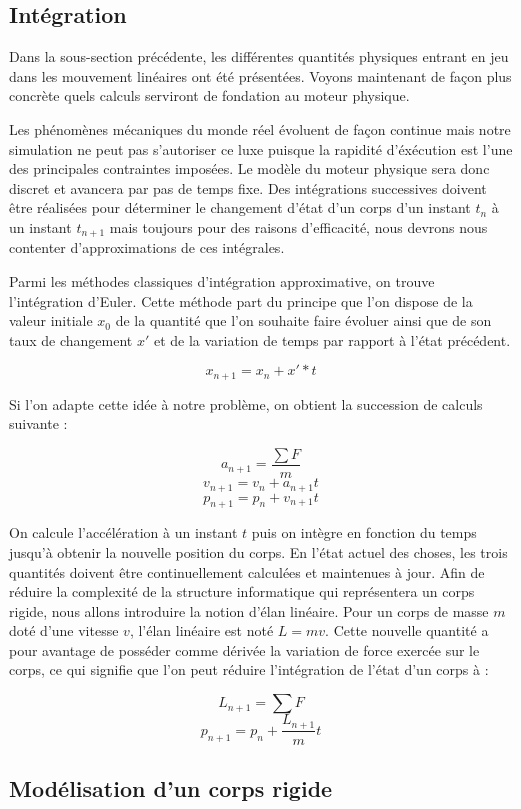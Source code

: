 \subsection{Intégration}

Dans la sous-section précédente, les différentes quantités physiques entrant en jeu dans les mouvement linéaires ont été présentées. Voyons maintenant de façon plus concrète quels calculs serviront de fondation au moteur physique.

Les phénomènes mécaniques du monde réel évoluent de façon continue mais notre simulation ne peut pas s'autoriser ce luxe puisque la rapidité d'éxécution est l'une des principales contraintes imposées. Le modèle du moteur physique sera donc discret et avancera par pas de temps fixe. Des intégrations successives doivent être réalisées pour déterminer le changement d'état d'un corps d'un instant $t_n$ à un instant $t_{n+1}$ mais toujours pour des raisons d'efficacité, nous devrons nous contenter d'approximations de ces intégrales.

Parmi les méthodes classiques d'intégration approximative, on trouve l'intégration d'Euler. Cette méthode part du principe que l'on dispose de la valeur initiale $x_0$ de la quantité que l'on souhaite faire évoluer ainsi que de son taux de changement $x'$ et de la variation de temps par rapport à l'état précédent.

\[x_{n+1} = x_{n} + x' * t\]

Si l'on adapte cette idée à notre problème, on obtient la succession de calculs suivante :

\[a_{n+1} = \frac{\sum F}{m}\]
\[v_{n+1} = v_n + a_{n+1} t\]
\[p_{n+1} = p_n + v_{n+1} t\]

On calcule l'accélération à un instant $t$ puis on intègre en fonction du temps jusqu'à obtenir la nouvelle position du corps. En l'état actuel des choses, les trois quantités doivent être continuellement calculées et maintenues à jour. Afin de réduire la complexité de la structure informatique qui représentera un corps rigide, nous allons introduire la notion d'élan linéaire. Pour un corps de masse $m$ doté d'une vitesse $v$, l'élan linéaire est noté $L = mv$. Cette nouvelle quantité a pour avantage de posséder comme dérivée la variation de force exercée sur le corps, ce qui signifie que l'on peut réduire l'intégration de l'état d'un corps à :

\[L_{n+1} = {\sum F}\]
\[p_{n+1} = p_n + \frac{L_{n+1}}{m} t\]

\subsection{Modélisation d'un corps rigide}

